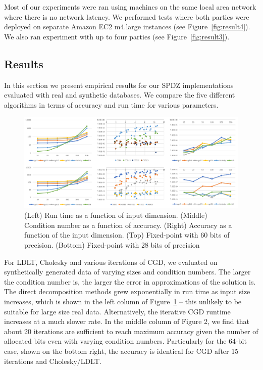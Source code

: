 \documentclass{article}
\begin{document}
Most of our experiments were ran using machines on the same local area network where there is no network latency. We performed tests where both parties were deployed on separate Amazon EC2 m4.large instances (see Figure~\ref{fig:result4}).
We also ran experiment with up to four parties (see Figure~\ref{fig:result3}).


\subsection{Results}

In this section we present empirical results for our SPDZ implementations evaluated with real and synthetic databases. We compare the five different algorithms in terms of accuracy and run time for various parameters. 

\begin{figure}[h!]
\centering
  \includegraphics[scale=0.4]{allregression.png}
    \caption{(Left) Run time as a function of input dimension. (Middle) Condition number as a function of accuracy. (Right) Accuracy as a function of the input dimension. (Top) Fixed-point with 60 bits of precision. (Bottom) Fixed-point with 28 bits of precision}
   \label{fig:result1}   
\end{figure}

For LDLT, Cholesky and various iterations of CGD, we evaluated on synthetically generated data of varying sizes and condition numbers. The larger the condition number is, the larger the error in approximations of the solution is. The direct decomposition methods grew exponentially in run time as input size increases, which is shown in the left column of Figure~\ref{fig:result1} -- this unlikely to be suitable for large size real data. Alternatively, the iterative CGD runtime increases at a much slower rate. In the middle column of Figure 2, we find that about 20 iterations are sufficient to reach maximum accuracy given the number of allocated bits even with varying condition numbers. Particularly for the 64-bit case, shown on the bottom right, the accuracy is identical for CGD after 15 iterations and Cholesky/LDLT.
\end{document}
